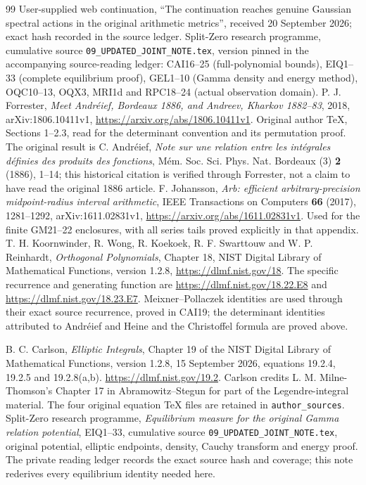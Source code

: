 \documentclass[11pt]{article}
\begin{document}
\begin{thebibliography}{99}
 User-supplied web continuation, ``The continuation reaches
genuine Gaussian spectral actions in the original arithmetic metrics'',
received 20 September 2026; exact hash recorded in the source ledger.
 Split-Zero research programme, cumulative source
\texttt{09\_UPDATED\_JOINT\_NOTE.tex}, version pinned in the accompanying
source-reading ledger: CAI16--25 (full-polynomial bounds), EIQ1--33
(complete equilibrium proof), GEL1--10 (Gamma density and energy method),
OQC10--13, OQX3, MRI1d and RPC18--24 (actual observation domain).
 P. J. Forrester, \emph{Meet Andr\'eief, Bordeaux 1886,
and Andreev, Kharkov 1882--83}, 2018, arXiv:1806.10411v1,
\url{https://arxiv.org/abs/1806.10411v1}. Original author TeX, Sections
1--2.3, read for the determinant convention and its permutation proof.
The original result is C. Andr\'eief, \emph{Note sur une relation entre
les int\'egrales d\'efinies des produits des fonctions},
M\'em. Soc. Sci. Phys. Nat. Bordeaux (3) \textbf{2} (1886), 1--14;
this historical citation is verified through Forrester, not a claim
to have read the original 1886 article.
 F. Johansson, \emph{Arb: efficient arbitrary-precision
midpoint-radius interval arithmetic}, IEEE Transactions on Computers
\textbf{66} (2017), 1281--1292, arXiv:1611.02831v1,
\url{https://arxiv.org/abs/1611.02831v1}. Used for the finite GM21--22
enclosures, with all series tails proved explicitly in that appendix.
 T. H. Koornwinder, R. Wong, R. Koekoek,
R. F. Swarttouw and W. P. Reinhardt, \emph{Orthogonal Polynomials},
Chapter 18, NIST Digital Library of Mathematical Functions, version 1.2.8,
\url{https://dlmf.nist.gov/18}. The specific recurrence and generating
function are \url{https://dlmf.nist.gov/18.22.E8} and
\url{https://dlmf.nist.gov/18.23.E7}.
Meixner--Pollaczek identities are used through their exact source
recurrence, proved in CAI19; the determinant identities attributed to
Andr\'eief and Heine and the Christoffel formula are proved above.


 B. C. Carlson, \emph{Elliptic Integrals}, Chapter 19 of
the NIST Digital Library of Mathematical Functions, version 1.2.8,
15 September 2026, equations 19.2.4, 19.2.5 and 19.2.8(a,b).
\url{https://dlmf.nist.gov/19.2}. Carlson credits L. M. Milne-Thomson's
Chapter 17 in Abramowitz--Stegun for part of the Legendre-integral material.
The four original equation TeX files are retained in \texttt{author\_sources}.
 Split-Zero research programme, \emph{Equilibrium measure for
the original Gamma relation potential}, EIQ1--33, cumulative source
\texttt{09\_UPDATED\_JOINT\_NOTE.tex}, original potential, elliptic endpoints,
density, Cauchy transform and energy proof. The private reading ledger
records the exact source hash and coverage; this note rederives every
equilibrium identity needed here.

\end{thebibliography}
\end{document}
